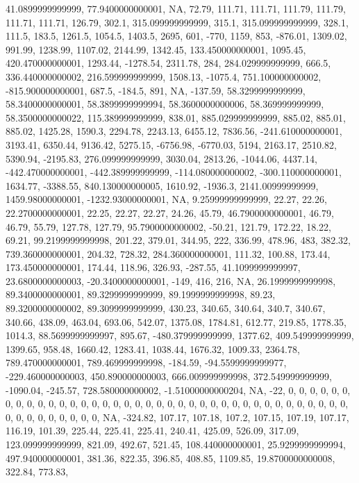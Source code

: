 \documentclass[
]{article}
\begin{document}
41.0899999999999, 77.9400000000001, NA, 72.79, 111.71, 111.71, 111.79,
111.79, 111.71, 111.71, 126.79, 302.1, 315.099999999999, 315.1,
315.099999999999, 328.1, 111.5, 183.5, 1261.5, 1054.5, 1403.5, 2695,
601, -770, 1159, 853, -876.01, 1309.02, 991.99, 1238.99, 1107.02,
2144.99, 1342.45, 133.450000000001, 1095.45, 420.470000000001, 1293.44,
-1278.54, 2311.78, 284, 284.029999999999, 666.5, 336.440000000002,
216.599999999999, 1508.13, -1075.4, 751.100000000002, -815.900000000001,
687.5, -184.5, 891, NA, -137.59, 58.3299999999999, 58.3400000000001,
58.3899999999994, 58.3600000000006, 58.369999999999, 58.3500000000022,
115.389999999999, 838.01, 885.029999999999, 885.02, 885.01, 885.02,
1425.28, 1590.3, 2294.78, 2243.13, 6455.12, 7836.56, -241.610000000001,
3193.41, 6350.44, 9136.42, 5275.15, -6756.98, -6770.03, 5194, 2163.17,
2510.82, 5390.94, -2195.83, 276.099999999999, 3030.04, 2813.26,
-1044.06, 4437.14, -442.470000000001, -442.389999999999,
-114.080000000002, -300.110000000001, 1634.77, -3388.55,
840.130000000005, 1610.92, -1936.3, 2141.00999999999, 1459.98000000001,
-1232.93000000001, NA, 9.25999999999999, 22.27, 22.26, 22.2700000000001,
22.25, 22.27, 22.27, 24.26, 45.79, 46.7900000000001, 46.79, 46.79,
55.79, 127.78, 127.79, 95.7900000000002, -50.21, 121.79, 172.22, 18.22,
69.21, 99.2199999999998, 201.22, 379.01, 344.95, 222, 336.99, 478.96,
483, 382.32, 739.360000000001, 204.32, 728.32, 284.360000000001, 111.32,
100.88, 173.44, 173.450000000001, 174.44, 118.96, 326.93, -287.55,
41.1099999999997, 23.6800000000003, -20.3400000000001, -149, 416, 216,
NA, 26.1999999999998, 89.3400000000001, 89.3299999999999,
89.1999999999998, 89.23, 89.3200000000002, 89.3099999999999, 430.23,
340.65, 340.64, 340.7, 340.67, 340.66, 438.09, 463.04, 693.06, 542.07,
1375.08, 1784.81, 612.77, 219.85, 1778.35, 1014.3, 88.5699999999997,
895.67, -480.379999999999, 1377.62, 409.549999999999, 1399.65, 958.48,
1660.42, 1283.41, 1038.44, 1676.32, 1009.33, 2364.78, 789.470000000001,
789.469999999998, -184.59, -94.5599999999977, -229.460000000003,
450.890000000003, 666.009999999998, 372.549999999999, -1090.04, -245.57,
728.580000000002, -1.51000000000204, NA, -22, 0, 0, 0, 0, 0, 0, 0, 0, 0,
0, 0, 0, 0, 0, 0, 0, 0, 0, 0, 0, 0, 0, 0, 0, 0, 0, 0, 0, 0, 0, 0, 0, 0,
0, 0, 0, 0, 0, 0, 0, 0, 0, 0, 0, 0, 0, 0, NA, -324.82, 107.17, 107.18,
107.2, 107.15, 107.19, 107.17, 116.19, 101.39, 225.44, 225.41, 225.41,
240.41, 425.09, 526.09, 317.09, 123.099999999999, 821.09, 492.67,
521.45, 108.440000000001, 25.9299999999994, 497.940000000001, 381.36,
822.35, 396.85, 408.85, 1109.85, 19.8700000000008, 322.84, 773.83,
\end{document}
